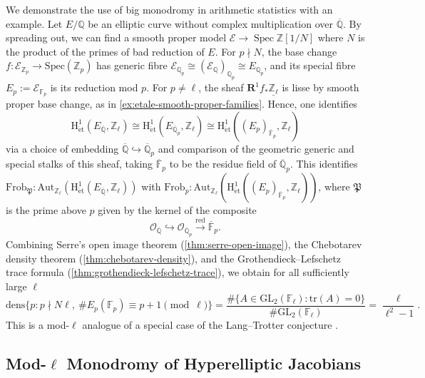 \documentclass[11pt,letterpaper]{article}
\theoremstyle{numberfirstplain}
\numberwithin{equation}{theorem}
\theoremstyle{numberfirstupright}
\begin{document}
We demonstrate the use of big monodromy in arithmetic statistics with an example. Let $E/\mathbb Q$ be an elliptic curve without complex multiplication over $\overline{\mathbb Q}$. 
  By spreading out, we can find a smooth proper model $\mathcal E\rightarrow\operatorname{Spec}\mathbb Z[1/N]$ where $N$ is the product of the primes of bad reduction of $E$. 
  For $p\nmid N$, the base change $f:\mathcal E_{\mathbb Z_p}\rightarrow\mathrm{Spec}(\mathbb Z_p)$ has generic fibre $\mathcal E_{\mathbb Q_p}\cong (\mathcal E_{\mathbb Q})_{\mathbb Q_p}\cong E_{\mathbb Q_p}$, and its special fibre $E_p:=\mathcal E_{\mathbb F_p}$ is its reduction mod $p$. 
  For $p\ne\ell$, the sheaf $\mathbf R^1f_*\underline{\mathbb Z_\ell}$ is lisse by smooth proper base change, as in \cref{ex:etale-smooth-proper-families}. Hence, one identifies
  \[
    \mathrm H^1_{\mathrm{\acute{e}t}}(E_{\overline{\mathbb Q}},\mathbb Z_\ell)
    \cong 
    \mathrm H^1_{\mathrm{\acute{e}t}}(E_{\overline{\mathbb Q}_p},\mathbb Z_\ell)
    \cong
    \mathrm H^1_{\mathrm{\acute{e}t}}((E_p)_{\overline{\mathbb F}_p},\mathbb Z_\ell)
  \]
  via a choice of embedding $\overline{\mathbb Q}\hookrightarrow\overline{\mathbb Q}_p$ and comparison of the geometric generic and special stalks of this sheaf, taking $\overline{\mathbb F}_p$ to be the residue field of $\overline{\mathbb Q}_p$.
  This identifies $\mathrm{Frob}_{\mathfrak P}:\mathrm{Aut}_{\mathbb Z_\ell}(\mathrm H^1_{\mathrm{\acute{e}t}}(E_{\overline{\mathbb Q}},\mathbb Z_\ell))$ with $\mathrm{Frob}_p:\mathrm{Aut}_{\mathbb Z_\ell}(\mathrm H^1_{\mathrm{\acute{e}t}}((E_p)_{\overline{\mathbb F}_p},\mathbb Z_\ell))$, where $\mathfrak P$ is the prime above $p$ given by the kernel of the composite
  \[\mathcal O_{\overline{\mathbb Q}}\hookrightarrow\mathcal O_{\overline{\mathbb Q}_p}\xrightarrow{\mathrm{red}}\overline{\mathbb F}_p.\]
  Combining Serre's open image theorem (\cref{thm:serre-open-image}), the Chebotarev density theorem (\cref{thm:chebotarev-density}), and the Grothendieck--Lefschetz trace formula (\cref{thm:grothendieck-lefschetz-trace}), we obtain for all sufficiently large $\ell$
  \[
    \mathrm{dens}\{p:p\nmid N\ell,\ \#E_p(\mathbb F_p)\equiv p+1\pmod\ell\}
    =\frac{\#\{A\in\mathrm{GL}_2(\mathbb F_\ell):\mathrm{tr}(A)=0\}}
          {\#\mathrm{GL}_2(\mathbb F_\ell)}
    =\frac{\ell}{\ell^2-1}.
  \]
  This is a mod-$\ell$ analogue of a special case of the Lang--Trotter conjecture \cite{LangTrotter1976}.


\subsection{Mod-\texorpdfstring{$\ell$}{l} Monodromy of Hyperelliptic Jacobians}
\end{document}
